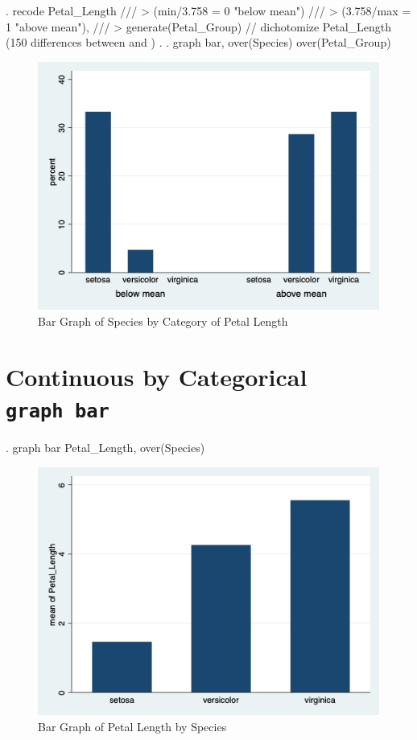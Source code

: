 \documentclass[
]{article}
\begin{document}
\begin{stlog}
. recode Petal_Length ///
> (min/3.758 = 0 "below mean") ///
> (3.758/max = 1 "above mean"), ///
> generate(Petal_Group) // dichotomize Petal_Length
(150 differences between {} and {})
{\smallskip}
.     
. graph bar, over(Species) over(Petal_Group)
\end{stlog}



\begin{figure}
\centering
\includegraphics[width=0.75\linewidth]{mybargraph2.png}
\caption{Bar Graph of Species by Category of Petal Length}
\end{figure}

\hypertarget{continuous-by-categorical-graph-bar}{%
\section{\texorpdfstring{Continuous by Categorical
\texttt{graph\ bar}}{Continuous by Categorical graph bar}}\label{continuous-by-categorical-graph-bar}}

\begin{stlog}
. graph bar Petal_Length, over(Species)
\end{stlog}



\begin{figure}
\centering
\includegraphics[width=0.75\linewidth]{mybargraph3.png}
\caption{Bar Graph of Petal Length by Species}
\end{figure}
\end{document}
